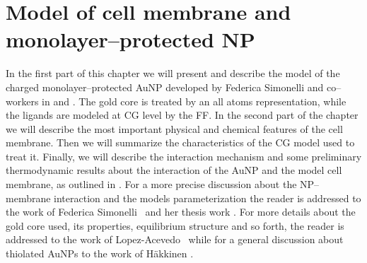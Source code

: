 \chapter{Model of cell membrane and monolayer--protected NP}
\label{chap:tre}
In the first part of this chapter we will present and describe the model of the charged monolayer--protected 
\ac{AuNP} developed by Federica Simonelli and co--workers in \cite{simonelliThesis} and \cite{ourPaper}. The gold 
core is treated by an all atoms representation, while the ligands are modeled at \ac{CG} level by the \martini 
\ac{FF}. In the second part of the chapter we will describe the most important physical and chemical features of 
the cell membrane. Then we will summarize the characteristics of the \ac{CG} model used to treat it. Finally, we 
will describe the interaction mechanism and some preliminary thermodynamic results about the interaction of the 
\ac{AuNP} and the model cell membrane, as outlined in \cite{ourPaper}. For a more precise discussion about the 
\ac{NP}--membrane interaction and the models parameterization the reader is addressed to the work of Federica 
Simonelli \etal\, \cite{ourPaper} and her thesis work \cite{simonelliThesis}. For more details about the gold core 
used, its properties, equilibrium structure and so forth, the reader is addressed to the work of Lopez-Acevedo 
\etal\, \cite{clusterEquilibrium} while for a general discussion about thiolated \acp{AuNP} to the work of 
Häkkinen \cite{corePassivated}.

